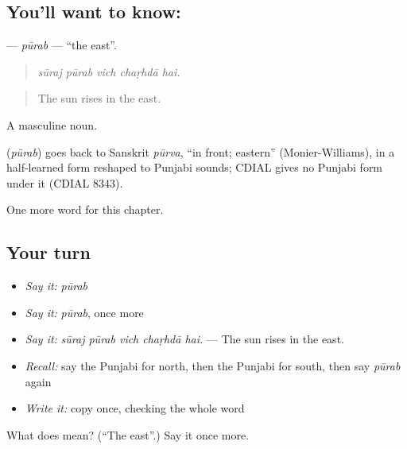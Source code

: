 \subsection*{You'll want to know: }
\textbf{} — \emph{pūrab} — \textquotedblleft{}the east\textquotedblright{}.

\begin{quote}
    
\end{quote}

\begin{quote}
\emph{sūraj pūrab vich chaṛhdā hai.}
\end{quote}

\begin{quote}
The sun rises in the east.
\end{quote}

A masculine noun.

\begin{cousinweb}
\textbf{} (\emph{pūrab}) goes back to Sanskrit \emph{pūrva}, \textquotedblleft{}in front; eastern\textquotedblright{} (Monier-Williams), in a half-learned form reshaped to Punjabi sounds; CDIAL gives no Punjabi form under it (CDIAL 8343).
\end{cousinweb}

\begin{grammarlens}[title={What you've built}]
One more word for this chapter.
\end{grammarlens}

\subsection*{Your turn}
\begin{itemize}
\raggedright
  \item \emph{Say it:} \emph{pūrab}
  \item \emph{Say it:} \emph{pūrab}, once more
  \item \emph{Say it:} \emph{sūraj pūrab vich chaṛhdā hai.} — The sun rises in the east.
  \item \emph{Recall:} say the Punjabi for north, then the Punjabi for south, then say \emph{pūrab} again
  \item \emph{Write it:} copy \textbf{} once, checking the whole word
\end{itemize}

\begin{tcolorbox}[breakable,colback=teal!4,colframe=teal!35!black,title={Before you move on}]
What does  mean? (\textquotedblleft{}The east\textquotedblright{}.) Say it once more.
\end{tcolorbox}
